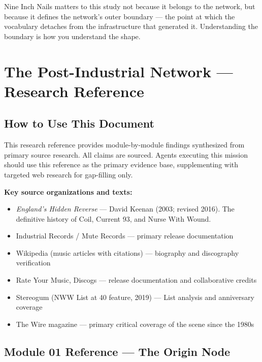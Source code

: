 \documentclass[11pt,letterpaper]{article}
\newcommand{\stageheader}[2]{%
  \noindent\colorbox{#2}{\makebox[\textwidth][l]{%
    \textcolor{white}{\bfseries\sffamily\hspace{6pt}#1\hspace{6pt}}}}%
  \vspace{0.5em}\par%
}
\begin{document}
Nine Inch Nails matters to this study not because it belongs to the network, but because it
defines the network's outer boundary — the point at which the vocabulary detaches from the
infrastructure that generated it. Understanding the boundary is how you understand the shape.

\newpage
\stageheader{STAGE 2 --- RESEARCH REFERENCE}{secondary}

\section{The Post-Industrial Network --- Research Reference}

\subsection{How to Use This Document}

This research reference provides module-by-module findings synthesized from primary source research.
All claims are sourced. Agents executing this mission should use this reference as the primary
evidence base, supplementing with targeted web research for gap-filling only.

\textbf{Key source organizations and texts:}
\begin{itemize}[noitemsep]
  \item \textit{England's Hidden Reverse} — David Keenan (2003; revised 2016). The definitive history
    of Coil, Current 93, and Nurse With Wound.
  \item Industrial Records / Mute Records — primary release documentation
  \item Wikipedia (music articles with citations) — biography and discography verification
  \item Rate Your Music, Discogs — release documentation and collaborative credits
  \item Stereogum (NWW List at 40 feature, 2019) — List analysis and anniversary coverage
  \item The Wire magazine — primary critical coverage of the scene since the 1980s
\end{itemize}

\subsection{Module 01 Reference --- The Origin Node}
\end{document}
